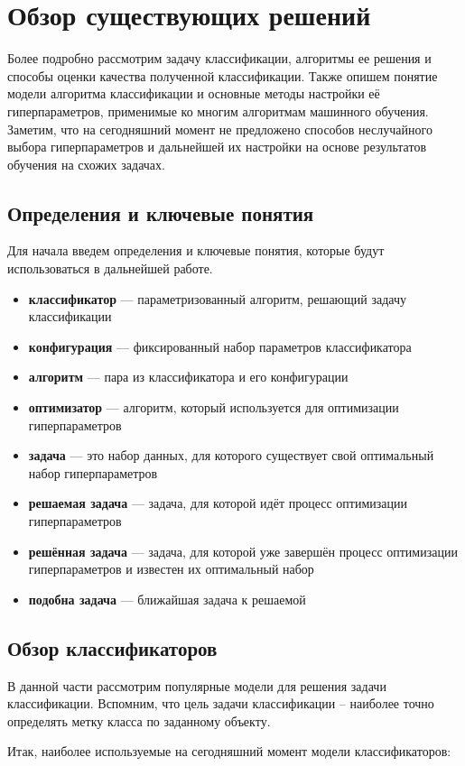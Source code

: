 \documentclass[times,specification,annotation]{itmo-student-thesis}
\begin{document}
	
	\chapter{Обзор существующих решений}\label{chp1}
	Более подробно рассмотрим задачу классификации, алгоритмы ее решения и способы оценки качества полученной классификации. Также опишем понятие модели алгоритма классификации и основные методы настройки её гиперпараметров, применимые ко многим алгоритмам машинного обучения.
	Заметим, что на сегодняшний момент не предложено способов неслучайного выбора гиперпараметров и дальнейшей их настройки на основе результатов обучения на схожих задачах.
	\startrelatedwork
	
	\section{Определения и ключевые понятия}
	Для начала введем определения и ключевые понятия, которые будут использоваться в дальнейшей работе.
	\begin{itemize}
		\item \textbf{классификатор} --- параметризованный алгоритм, решающий задачу классификации
		\item \textbf{конфигурация} --- фиксированный набор параметров классификатора
		\item \textbf{алгоритм} --- пара из классификатора и его конфигурации 
		\item \textbf{оптимизатор} --- алгоритм, который используется для оптимизации гиперпараметров
		\item \textbf{задача} --- это набор данных, для которого существует свой оптимальный набор гиперпараметров
		\item \textbf{решаемая задача} --- задача, для которой идёт процесс оптимизации гиперпараметров
		\item \textbf{решённая задача} --- задача, для которой уже завершён процесс оптимизации гиперпараметров и известен их оптимальный набор
		\item \textbf{подобна задача} --- ближайшая задача к решаемой
	\end{itemize}
	\section{Обзор классификаторов}
	В данной части рассмотрим популярные модели для решения задачи классификации. Вспомним, что цель задачи классификации -- наиболее точно определять метку класса по заданному объекту. \par
	Итак, наиболее используемые на сегодняшний момент модели классификаторов:
	
\end{document}
